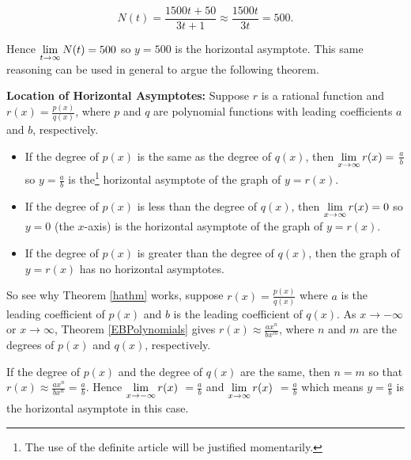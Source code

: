 \documentclass{ximera}
\begin{document}
 \[ N(t) = \dfrac{1500t + 50}{3t+1} \approx \dfrac{1500t}{3t} = 500.\]
 
Hence $\ds{\lim_{t \rightarrow  \infty} N(t) = 500}$ so  $y = 500$ is the horizontal asymptote.  This same reasoning can be used in general to argue the following theorem.

\smallskip
\colorbox{ResultColor}{\bbm

\begin{thm} \textbf{Location of Horizontal Asymptotes:}\label{hathm} Suppose $r$ is a rational function and $r(x) = \frac{p(x)}{q(x)}$, where $p$ and $q$ are polynomial functions with leading coefficients $a$ and $b$, respectively. 

\begin{itemize}

\item  If the degree of $p(x)$ is the same as the degree of $q(x)$, then $\ds{\lim_{x \rightarrow \infty} r(x) =}$ $\frac{a}{b}$ so $y=\frac{a}{b}$ is the\footnote{The use of the definite article will be justified momentarily.} horizontal asymptote of the graph of $y=r(x)$.

\item  If the degree of $p(x)$ is less than the degree of $q(x)$, then $\ds{\lim_{x \rightarrow \infty} r(x) =0}$  so $y=0$ (the $x$-axis) is the horizontal asymptote of the graph of $y=r(x)$.

\item  If the degree of $p(x)$ is greater than the degree of $q(x)$, then the graph of $y=r(x)$ has no horizontal asymptotes.


\end{itemize}
\end{thm}
\ebm}
\smallskip



So see why Theorem \ref{hathm} works, suppose $r(x) = \frac{p(x)}{q(x)}$ where $a$ is the leading coefficient of $p(x)$ and $b$ is the leading coefficient of $q(x)$. As $x \rightarrow  -\infty$ or $x \rightarrow \infty$,  Theorem \ref{EBPolynomials} gives $r(x) \approx \frac{ax^n}{bx^m}$, where $n$ and $m$ are the degrees of $p(x)$ and $q(x)$, respectively. 

If the degree of $p(x)$ and the degree of $q(x)$ are the same, then $n=m$ so that $r(x) \approx \frac{ax^n}{bx^n} = \frac{a}{b}$.  Hence $\ds{\lim_{x \rightarrow  -\infty} r(x)}$ $=\frac{a}{b}$  and $\ds{\lim_{x \rightarrow  \infty} r(x)}$ $=\frac{a}{b}$ which means $y=\frac{a}{b}$ is the horizontal asymptote in this case.  
\end{document}
